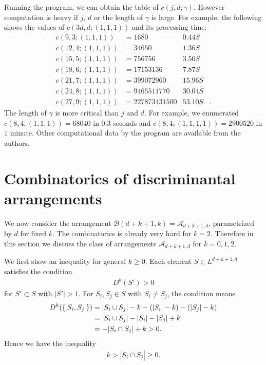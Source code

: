 \documentclass{wstmp}
\begin{document}
Running the program,
we can obtain the table of $c(j,d;\gamma)$.
However computation is heavy 
if $j$, $d$ or the length of $\gamma$ is large.
For example, the following shows 
the values of $c(3d,d;(1,1,1))$ and its processing time:
\begin{align*}
c(9,3;(1,1,1))&= 1680 &0.44S&\\
c(12,4;(1,1,1))&= 34650 &1.36S&\\
c(15,5;(1,1,1))&= 756756 &3.50S&\\
c(18,6;(1,1,1))&= 17153136 &7.87S&\\
c(21,7;(1,1,1))&= 399072960 &15.96S&\\
c(24,8;(1,1,1))&= 9465511770 &30.04S&\\
c(27,9;(1,1,1))&= 227873431500 &53.10S&.
\end{align*}
The length of $\gamma$ is more critical than $j$ and $d$.
For example,
we enumerated $c(8,4;(1,1,1))=68040$ in $0.3$ seconds and
$c(8,4;(1,1,1,1))=2900520$ in $1$ minute.  
Other computational data by the program are available 
from the authors.

\section{Combinatorics of discriminantal arrangements}
\label{sec:disc} 
We now consider the arrangement ${\mathcal{B}}(d+k+1,k)={\mathcal{A}}_{d+k+1,d}$,
parametrized by $d$ for fixed $k$.
The combinatorics is already very hard for $k=2$. Therefore 
in this section we discuss the class of arrangements ${\mathcal{A}}_{d+k+1,d}$ for $k=0,1,2$.

We first show an inequality for general  $k\geq 0$.
Each element $S \in L^{d+k+1,d}$ satisfies
the condition
\begin{align*}
D^k(S')>0
\end{align*}
for $S'\subset S$ with ${\left|{S'}\right|}>1$.
For $S_i,S_j \in S$ with $S_i\neq S_j$,
the condition means
\begin{align*}
D^k(\Set{S_i,S_j})
&={\left|{S_i \cup S_j}\right|} -k -({\left|{S_i}\right|}-k) -({\left|{S_j}\right|}-k)\\
 &={\left|{S_i \cup S_j}\right|} -{\left|{S_i}\right|}-{\left|{S_j}\right|}+k\\
 &=-{\left|{S_i \cap S_j}\right|}+k>0.
\end{align*}
Hence we have the inequality
\begin{align}
\label{ineq:pair}
k>{\left|{S_i \cap S_j}\right|}\geq 0.
\end{align}
\end{document}
